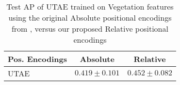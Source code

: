 \begin{table}[]
    \centering
    \caption{Test AP of UTAE trained on Vegetation features using the original Absolute positional encodings from \cite{gerard2023wildfirespreadts}, versus our proposed Relative positional encodings}
    \begin{tabular}{lcc}
    \toprule
    \textbf{Pos. Encodings} &  \textbf{Absolute} & \textbf{Relative}\\ %
    \midrule
    UTAE & $0.419 \pm 0.101$ & $\mathbf{0.452 \pm 0.082}$\\
    \bottomrule
    \end{tabular}
    \label{tab:ablation_pos_enc}
\end{table}

